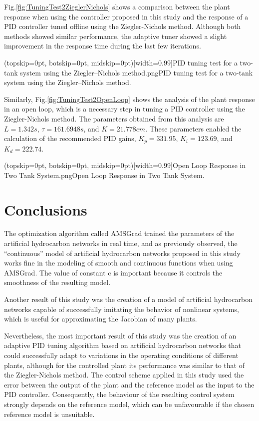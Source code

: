 \documentclass{ieeeaccess}
\begin{document}
Fig.\ref{fig:TuningTest2ZieglerNichols} shows a comparison between the plant response when using the controller proposed in this study and the response of a PID controller tuned offline using the Ziegler-Nichols method. Although both methods showed similar performance, the adaptive tuner showed a slight improvement in the response time during the last few iterations.

\Figure[ht!](topskip=0pt, botskip=0pt, midskip=0pt)[width=0.99\columnwidth]{PID tuning test for a two-tank system using the Ziegler–Nichols method.png}{PID tuning test for a two-tank system using the Ziegler–Nichols method\label{fig:TuningTest2ZieglerNichols}.}

Similarly, Fig.\ref{fig:TuningTest2OpenLoop} shows the analysis of the plant response in an open loop, which is a necessary step in tuning a PID controller using the Ziegler-Nichols method. The parameters obtained from this analysis are \(L = 1.342 s\), \(\tau=161.6948 s\), and \(K = 21.778 cm\). These parameters enabled the calculation of the recommended PID gains, \(K_p=331.95\), \(K_i=123.69\), and \(K_d=222.74\).

\Figure[ht!](topskip=0pt, botskip=0pt, midskip=0pt)[width=0.99\columnwidth]{Open Loop Response in Two Tank System.png}{Open Loop Response in Two Tank System\label{fig:TuningTest2OpenLoop}.}

\section{Conclusions}
\label{sec:conclusions}


The optimization algorithm called AMSGrad trained the parameters of the artificial hydrocarbon networks in real time, and as previously observed, the “continuous” model of artificial hydrocarbon networks proposed in this study works fine in the modeling of smooth and continuous functions when using AMSGrad. The value of constant c is important because it controls the smoothness of the resulting model.

Another result of this study was the creation of a model of artificial hydrocarbon networks capable of successfully imitating the behavior of nonlinear systems, which is useful for approximating the Jacobian of many plants.

Nevertheless, the most important result of this study was the creation of an adaptive PID tuning algorithm based on artificial hydrocarbon networks that could successfully adapt to variations in the operating conditions of different plants, although for the controlled plant its performance was similar to that of the Ziegler-Nichols method. The control scheme applied in this study used the error between the output of the plant and the reference model as the input to the PID controller. Consequently, the behaviour of the resulting control system strongly depends on the reference model, which can be unfavourable if the chosen reference model is unsuitable.
\end{document}
